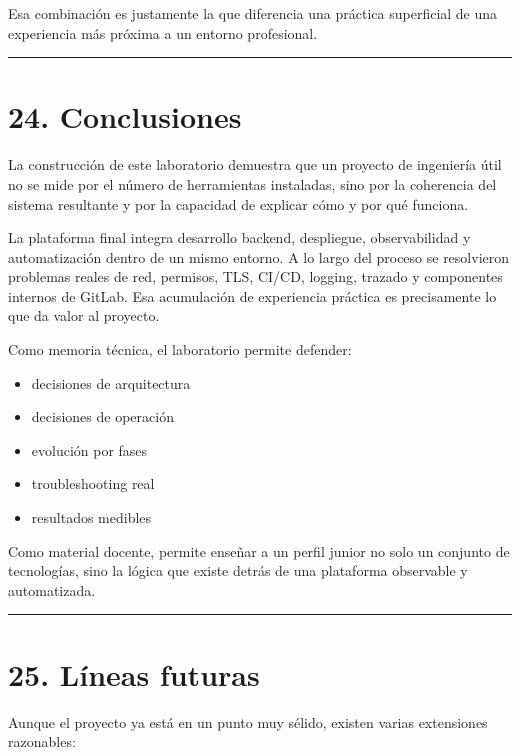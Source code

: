 \documentclass[
a4paper,
12pt]{report}
\providecommand{\tightlist}{%
  \setlength{\itemsep}{0pt}\setlength{\parskip}{0pt}}
\begin{document}
Esa combinación es justamente la que diferencia una práctica superficial
de una experiencia más próxima a un entorno profesional.

\begin{center}\rule{0.5\linewidth}{0.5pt}\end{center}

\chapter{24. Conclusiones}\label{conclusiones}

La construcción de este laboratorio demuestra que un proyecto de
ingeniería útil no se mide por el número de herramientas instaladas,
sino por la coherencia del sistema resultante y por la capacidad de
explicar cómo y por qué funciona.

La plataforma final integra desarrollo backend, despliegue,
observabilidad y automatización dentro de un mismo entorno. A lo largo
del proceso se resolvieron problemas reales de red, permisos, TLS,
CI/CD, logging, trazado y componentes internos de GitLab. Esa
acumulación de experiencia práctica es precisamente lo que da valor al
proyecto.

Como memoria técnica, el laboratorio permite defender:

\begin{itemize}
\tightlist
\item
  decisiones de arquitectura
\item
  decisiones de operación
\item
  evolución por fases
\item
  troubleshooting real
\item
  resultados medibles
\end{itemize}

Como material docente, permite enseñar a un perfil junior no solo un
conjunto de tecnologías, sino la lógica que existe detrás de una
plataforma observable y automatizada.

\begin{center}\rule{0.5\linewidth}{0.5pt}\end{center}

\chapter{25. Líneas futuras}\label{luxedneas-futuras}

Aunque el proyecto ya está en un punto muy sélido, existen varias
extensiones razonables:
\end{document}

